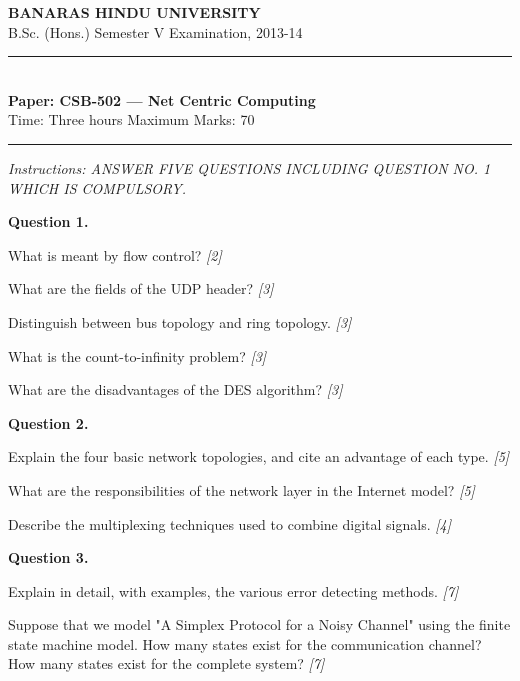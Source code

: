 \documentclass[11pt,a4paper]{article}
\newcommand{\pts}[1]{\hfill   \textit{[#1]}}
\begin{document}
\begin{center}
  {\large\bfseries BANARAS HINDU UNIVERSITY}\\[2pt]
  {\normalsize B.Sc. (Hons.) Semester V Examination, 2013-14}\\[6pt]
  \rule{0.8\linewidth}{0.5pt}\\[6pt]
  {\large\bfseries Paper: CSB-502 --- Net Centric Computing}\\[4pt]
  {\normalsize Time: Three hours \hfill Maximum Marks: 70}
\end{center}

\rule{\linewidth}{0.4pt}

\smallskip



\noindent   \textit{Instructions: ANSWER FIVE QUESTIONS INCLUDING QUESTION NO. 1 WHICH IS COMPULSORY.}

\bigskip

\medskip


\noindent   \textbf{Question 1.}

\begin{parts}
  \item What is meant by flow control? \pts{2}
  \item What are the fields of the UDP header? \pts{3}
  \item Distinguish between bus topology and ring topology. \pts{3}
  \item What is the count-to-infinity problem? \pts{3}
  \item What are the disadvantages of the DES algorithm? \pts{3}
\end{parts}

\medskip


\noindent   \textbf{Question 2.}

\begin{parts}
  \item Explain the four basic network topologies, and cite an advantage of each type. \pts{5}
  \item What are the responsibilities of the network layer in the Internet model? \pts{5}
  \item Describe the multiplexing techniques used to combine digital signals. \pts{4}
\end{parts}

\medskip


\noindent   \textbf{Question 3.}

\begin{parts}
  \item Explain in detail, with examples, the various error detecting methods. \pts{7}
  \item Suppose that we model "A Simplex Protocol for a Noisy Channel" using the finite state machine model. How many states exist for the communication channel? How many states exist for the complete system? \pts{7}
\end{parts}
\end{document}
